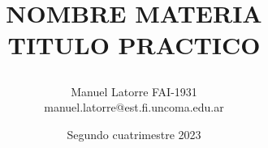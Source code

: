 \begin{titlepage}
  \title{\textbf{NOMBRE MATERIA}\\
  \large{\textbf{TITULO PRACTICO}}
  \author{
  Manuel Latorre FAI-1931\\ manuel.latorre@est.fi.uncoma.edu.ar\vspace{3mm}\\
  }}
  \date{Segundo cuatrimestre 2023}

  \maketitle
  \vspace{25mm}
  \vfill
\end{titlepage}

\titlepage

\newpage

\pagebreak